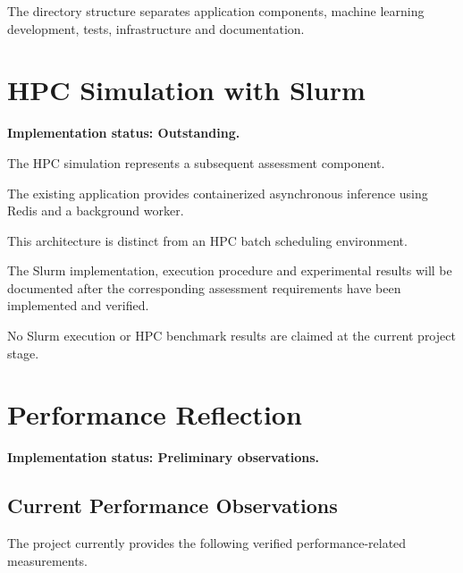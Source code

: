 \documentclass[11pt,a4paper]{article}
\begin{document}
The directory structure separates application
components, machine learning development, tests,
infrastructure and documentation.


\section{HPC Simulation with Slurm}

\textbf{Implementation status: Outstanding.}

The HPC simulation represents a subsequent
assessment component.

The existing application provides containerized
asynchronous inference using Redis and a
background worker.

This architecture is distinct from an HPC
batch scheduling environment.

The Slurm implementation, execution procedure
and experimental results will be documented
after the corresponding assessment requirements
have been implemented and verified.

No Slurm execution or HPC benchmark results
are claimed at the current project stage.


\section{Performance Reflection}

\textbf{Implementation status: Preliminary observations.}

\subsection{Current Performance Observations}

The project currently provides the following
verified performance-related measurements.
\end{document}

